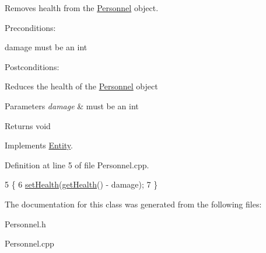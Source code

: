 Removes health from the \hyperlink{classPersonnel}{Personnel} object. 

Preconditions\+:
\begin{DoxyItemize}
\item damage must be an int
\end{DoxyItemize}

Postconditions\+:
\begin{DoxyItemize}
\item Reduces the health of the \hyperlink{classPersonnel}{Personnel} object
\end{DoxyItemize}


\begin{DoxyParams}{Parameters}
{\em damage} & must be an int \\
\hline
\end{DoxyParams}
\begin{DoxyReturn}{Returns}
void 
\end{DoxyReturn}


Implements \hyperlink{classEntity}{Entity}.



Definition at line 5 of file Personnel.\+cpp.


\begin{DoxyCode}
5                                      \{
6     \hyperlink{classEntity_a7dae281ff92be9bc98672cafe05c77ab}{setHealth}(\hyperlink{classEntity_a2b0140ae8c77c0e3654b070ee3c7fe57}{getHealth}() - damage);
7 \}
\end{DoxyCode}


The documentation for this class was generated from the following files\+:\begin{DoxyCompactItemize}
\item 
Personnel.\+h\item 
Personnel.\+cpp\end{DoxyCompactItemize}
